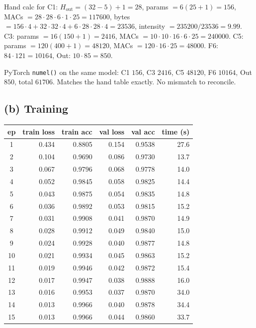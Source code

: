 \documentclass[11pt]{article}
\begin{document}
Hand calc for C1: \(H_{\mathrm{out}}=(32-5)+1=28\),
params \(=6(25+1)=156\), MACs \(=28\cdot28\cdot6\cdot1\cdot25=117600\),
bytes \(=156\cdot4 + 32\cdot32\cdot4 + 6\cdot28\cdot28\cdot4=23536\),
intensity \(=235200/23536=9.99\).
C3: params \(=16(150+1)=2416\), MACs \(=10\cdot10\cdot16\cdot6\cdot25=240000\).
C5: params \(=120(400+1)=48120\), MACs \(=120\cdot16\cdot25=48000\).
F6: \(84\cdot121=10164\), Out: \(10\cdot85=850\).

PyTorch \texttt{numel()} on the same model: C1 \(156\), C3 \(2416\),
C5 \(48120\), F6 \(10164\), Out \(850\), total \(61706\). Matches the
hand table exactly. No mismatch to reconcile.

\subsection*{(b) Training}

\begin{center}
\footnotesize
\begin{tabular}{crrrrr}
    \toprule
    ep & train loss & train acc & val loss & val acc & time (s) \\
    \midrule
    1  & 0.434 & 0.8805 & 0.154 & 0.9538 & 27.6 \\
    2  & 0.104 & 0.9690 & 0.086 & 0.9730 & 13.7 \\
    3  & 0.067 & 0.9796 & 0.068 & 0.9778 & 14.0 \\
    4  & 0.052 & 0.9845 & 0.058 & 0.9825 & 14.4 \\
    5  & 0.043 & 0.9875 & 0.054 & 0.9835 & 14.8 \\
    6  & 0.036 & 0.9892 & 0.053 & 0.9815 & 15.2 \\
    7  & 0.031 & 0.9908 & 0.041 & 0.9870 & 14.9 \\
    8  & 0.028 & 0.9912 & 0.049 & 0.9840 & 15.0 \\
    9  & 0.024 & 0.9928 & 0.040 & 0.9877 & 14.8 \\
    10 & 0.021 & 0.9934 & 0.045 & 0.9863 & 15.2 \\
    11 & 0.019 & 0.9946 & 0.042 & 0.9872 & 15.4 \\
    12 & 0.017 & 0.9947 & 0.038 & 0.9888 & 16.0 \\
    13 & 0.016 & 0.9953 & 0.037 & 0.9870 & 34.0 \\
    14 & 0.013 & 0.9966 & 0.040 & 0.9878 & 34.4 \\
    15 & 0.013 & 0.9966 & 0.044 & 0.9860 & 33.7 \\
    \bottomrule
\end{tabular}
\end{center}
\end{document}
